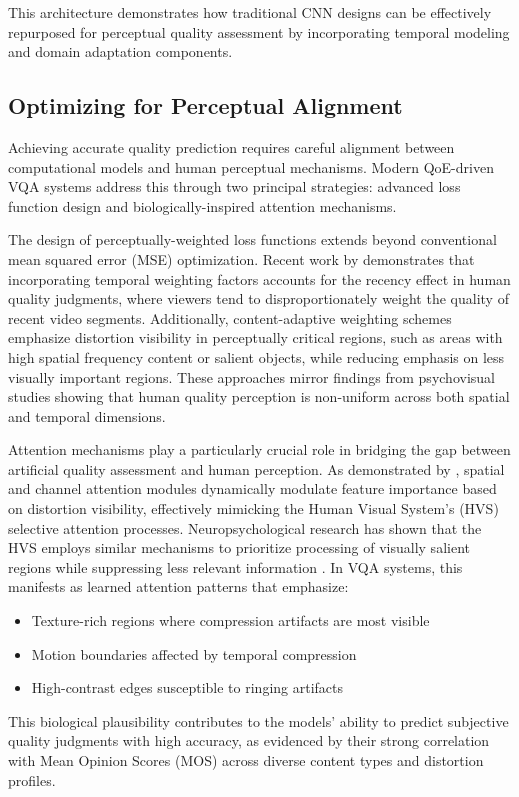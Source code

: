 This architecture demonstrates how traditional CNN designs can be effectively repurposed for perceptual quality assessment by incorporating temporal modeling and domain adaptation components.

\subsection{Optimizing for Perceptual Alignment}  
Achieving accurate quality prediction requires careful alignment between computational models and human perceptual mechanisms. Modern QoE-driven VQA systems address this through two principal strategies: advanced loss function design and biologically-inspired attention mechanisms.

The design of perceptually-weighted loss functions extends beyond conventional mean squared error (MSE) optimization. Recent work by \cite{min2024perceptual} demonstrates that incorporating temporal weighting factors accounts for the recency effect in human quality judgments, where viewers tend to disproportionately weight the quality of recent video segments. Additionally, content-adaptive weighting schemes emphasize distortion visibility in perceptually critical regions, such as areas with high spatial frequency content or salient objects, while reducing emphasis on less visually important regions. These approaches mirror findings from psychovisual studies showing that human quality perception is non-uniform across both spatial and temporal dimensions.

Attention mechanisms play a particularly crucial role in bridging the gap between artificial quality assessment and human perception. As demonstrated by \cite{wu2022fastvqa}, spatial and channel attention modules dynamically modulate feature importance based on distortion visibility, effectively mimicking the Human Visual System's (HVS) selective attention processes. Neuropsychological research has shown that the HVS employs similar mechanisms to prioritize processing of visually salient regions while suppressing less relevant information \cite{itti1998model}. In VQA systems, this manifests as learned attention patterns that emphasize:
\begin{itemize}
    \item Texture-rich regions where compression artifacts are most visible
    \item Motion boundaries affected by temporal compression
    \item High-contrast edges susceptible to ringing artifacts
\end{itemize}
This biological plausibility contributes to the models' ability to predict subjective quality judgments with high accuracy, as evidenced by their strong correlation with Mean Opinion Scores (MOS) across diverse content types and distortion profiles. 

